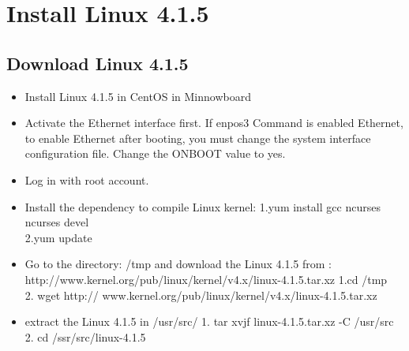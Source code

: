 \documentclass[10pt,draftclsnofoot,peerreview ,letterpaper,onecolumn,]{IEEEtran}
\begin{document}
	\newpage
	\section{Install Linux 4.1.5}
	\subsection{Download Linux 4.1.5}
	\begin{itemize}
		\item Install Linux 4.1.5 in CentOS in Minnowboard\\
		\item Activate the Ethernet interface first. If enpos3 Command is enabled Ethernet, to enable Ethernet after booting, you must change the system interface configuration file. Change the ONBOOT value to yes.\\
		\item Log in with root account. \\
		\item Install the dependency to compile Linux kernel:
			1.yum install gcc ncurses ncurses devel \\
			2.yum update\\
		\item Go to the directory: /tmp and download the Linux 4.1.5 from : http://www.kernel.org/pub/linux/kernel/v4.x/linux-4.1.5.tar.xz
			1.cd /tmp \\
			2. wget http:// www.kernel.org/pub/linux/kernel/v4.x/linux-4.1.5.tar.xz\\
		\item extract the Linux 4.1.5 in /usr/src/
			1. tar xvjf linux-4.1.5.tar.xz -C /usr/src \\
			2. cd /ssr/src/linux-4.1.5\\
	\end{itemize}
	
\end{document}
